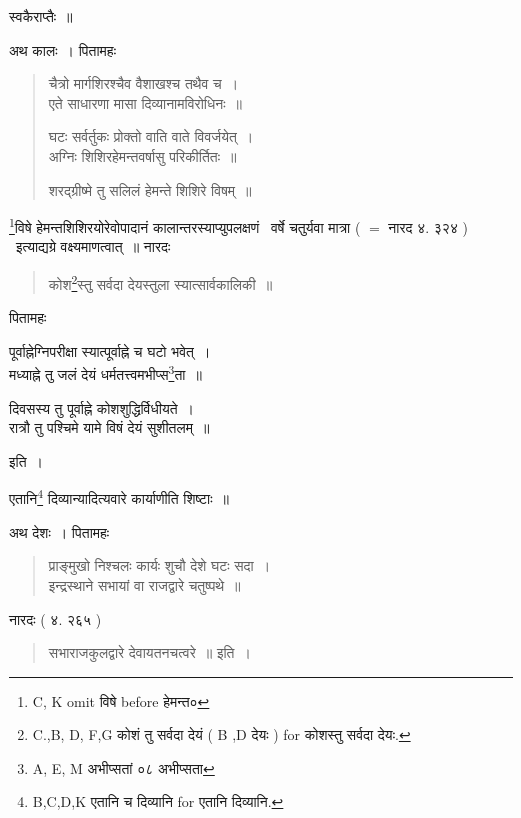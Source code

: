 \documentclass[11pt, openany]{book}
\begin{document}
\noindent
स्वकैराप्तैः~॥

अथ कालः~। पितामहः

\begin{quote}
{\vy चैत्रो मार्गशिरश्चैव वैशाखश्च तथैव च~।\\
एते साधारणा मासा दिव्यानामविरोधिनः~॥

घटः सर्वर्तुकः प्रोक्तो वाति वाते विवर्जयेत्~।\\
अग्निः शिशिरहेमन्तवर्षासु परिकीर्तितः~॥

शरद्ग्रीष्मे तु सलिलं हेमन्ते शिशिरे विषम्~॥}
\end{quote}

\renewcommand{\thefootnote}{6}\footnote{C, K omit विषे before हेमन्त०}विषे हेमन्तशिशिरयोरेवोपादानं कालान्तरस्याप्युपलक्षणं \textendash\ वर्षे चतुर्यवा मात्रा ( $=$ नारद ४. ३२४ ) \textendash\ इत्याद्यग्रे वक्ष्यमाणत्वात्~॥ नारदः

\begin{quote}
{\vy कोश\renewcommand{\thefootnote}{7}\footnote{C.,B, D, F,G कोशं तु सर्वदा देयं ( B ,D देयः ) for कोशस्तु सर्वदा देयः.}स्तु सर्वदा देयस्तुला स्यात्सार्वकालिकी~॥}
\end{quote}

\newpage
{}

पितामहः 

\begin{center}
{\vy पूर्वाह्नेग्निपरीक्षा स्यात्पूर्वाह्ने च घटो भवेत्~।\\
मध्याह्ने तु जलं देयं धर्मतत्त्वमभीप्स\renewcommand{\thefootnote}{1}\footnote{A, E, M अभीप्सतां ०८ अभीप्सता}ता~॥

दिवसस्य तु पूर्वाह्ने कोशशुद्धिर्विधीयते~।\\
रात्रौ तु पश्चिमे यामे विषं देयं सुशीतलम्~॥} इति~।
\end{center}

\noindent
एतानि\renewcommand{\thefootnote}{2}\footnote{B,C,D,K एतानि च दिव्यानि for एतानि दिव्यानि.} दिव्यान्यादित्यवारे कार्याणीति शिष्टाः~॥ 

अथ देशः~। पितामहः

\begin{quote}
{\vy प्राङ्मुखो निश्चलः कार्यः शुचौ देशे घटः सदा~।\\
इन्द्रस्थाने सभायां वा राजद्वारे चतुष्पथे~॥}
\end{quote}

नारदः ( ४. २६५ )

\begin{quote}
{\vy सभाराजकुलद्वारे देवायतनचत्वरे~॥} इति~।
\end{quote}
\end{document}
